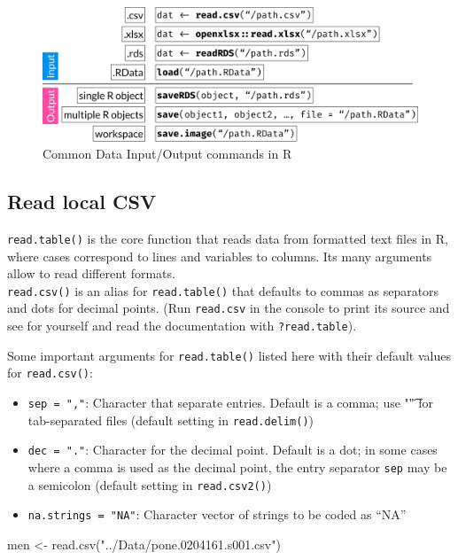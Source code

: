 \documentclass[
]{book}
\newenvironment{Shaded}{\begin{snugshade}}{\end{snugshade}}
\newcommand{\FunctionTok}[1]{\textcolor[rgb]{0.00,0.00,0.00}{#1}}
\newcommand{\NormalTok}[1]{#1}
\newcommand{\OtherTok}[1]{\textcolor[rgb]{0.56,0.35,0.01}{#1}}
\newcommand{\StringTok}[1]{\textcolor[rgb]{0.31,0.60,0.02}{#1}}
\providecommand{\tightlist}{%
  \setlength{\itemsep}{0pt}\setlength{\parskip}{0pt}}
\begin{document}
\begin{figure}

{\centering \includegraphics[width=0.8\linewidth]{./R_dataio} 

}

\caption{Common Data Input/Output commands in R}\label{fig:FigRDataIO}
\end{figure}

\hypertarget{read-local-csv}{%
\subsection{Read local CSV}\label{read-local-csv}}

\texttt{read.table()} is the core function that reads data from formatted text files in R, where cases correspond to lines and variables to columns. Its many arguments allow to read different formats.\\
\texttt{read.csv()} is an alias for \texttt{read.table()} that defaults to commas as separators and dots for decimal points. (Run \texttt{read.csv} in the console to print its source and see for yourself and read the documentation with \texttt{?read.table}).

Some important arguments for \texttt{read.table()} listed here with their default values for \texttt{read.csv()}:

\begin{itemize}
\tightlist
\item
  \texttt{sep\ =\ ","}: Character that separate entries. Default is a comma; use "\t" for tab-separated files (default setting in \texttt{read.delim()})
\item
  \texttt{dec\ =\ "."}: Character for the decimal point. Default is a dot; in some cases where a comma is used as the decimal point, the entry separator \texttt{sep} may be a semicolon (default setting in \texttt{read.csv2()})
\item
  \texttt{na.strings\ =\ "NA"}: Character vector of strings to be coded as ``NA''
\end{itemize}

\begin{Shaded}
\begin{Highlighting}[]
\NormalTok{men }\OtherTok{\textless{}{-}}  \FunctionTok{read.csv}\NormalTok{(}\StringTok{"../Data/pone.0204161.s001.csv"}\NormalTok{)}
\end{Highlighting}
\end{Shaded}
\end{document}
